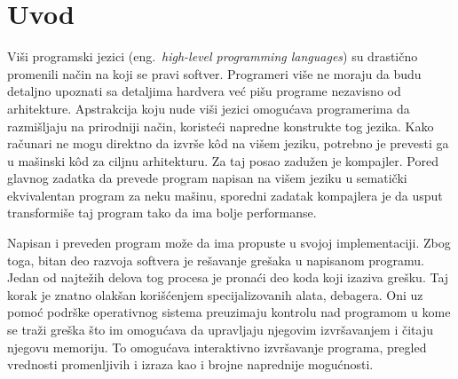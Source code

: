 \documentclass[12pt,oneside]{memoir}
\begin{document}
\frontmatter
\naslovna
\komisija
\posveta{}
\apstrakt
\tableofcontents*

\mainmatter

\chapter{Uvod}

Viši programski jezici (eng.~{\em high-level programming languages}) su drastično promenili način na koji se pravi softver.
Programeri više ne moraju da budu detaljno upoznati sa detaljima hardvera već pišu programe nezavisno od arhitekture.
Apstrakcija koju nude viši jezici omogućava programerima da razmišljaju na prirodniji način, koristeći napredne konstrukte tog jezika.
Kako računari ne mogu direktno da izvrše k\^od na višem jeziku, potrebno je prevesti ga u mašinski k\^od za ciljnu arhitekturu.
Za taj posao zadužen je kompajler.
%
Pored glavnog zadatka da prevede program napisan na višem jeziku u sematički ekvivalentan program za neku mašinu, sporedni zadatak kompajlera je da usput transformiše taj program tako da ima bolje performanse.

Napisan i preveden program može da ima propuste u svojoj implementaciji. Zbog toga,
bitan deo razvoja softvera je rešavanje grešaka u napisanom programu.
Jedan od najtežih delova tog procesa je pronaći deo koda koji izaziva grešku.
Taj korak je znatno olakšan korišćenjem specijalizovanih alata, debagera.
Oni uz pomoć podrške operativnog sistema preuzimaju kontrolu nad programom u kome se traži greška što im omogućava da upravljaju njegovim izvršavanjem i čitaju njegovu memoriju.
To omogućava interaktivno izvršavanje programa, pregled vrednosti promenljivih i izraza kao i brojne naprednije mogućnosti.
\end{document}
